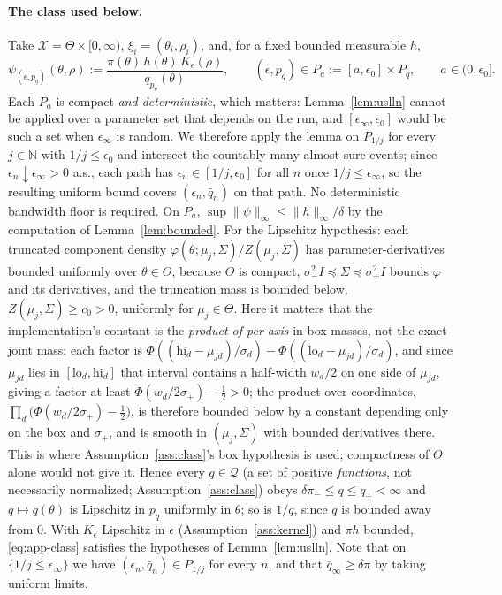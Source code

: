 \documentclass[10pt]{article}
\theoremstyle{plain}
\theoremstyle{definition}
\begin{document}
\paragraph{The class used below.} Take $\mathcal{X}=\Theta\times[0,\infty)$, $\xi_i=(\theta_i,\rho_i)$, and, for a fixed bounded measurable $h$,
\begin{equation}
\psi_{(\epsilon,p_q)}(\theta,\rho):=\frac{\pi(\theta)\,h(\theta)\,K_\epsilon(\rho)}{q_{p_q}(\theta)},
\qquad
(\epsilon,p_q)\in P_a:=[a,\epsilon_0]\times P_q,\qquad a\in(0,\epsilon_0] .
\label{eq:app-class}
\end{equation}
Each $P_a$ is compact \emph{and deterministic}, which matters: Lemma~\ref{lem:uslln} cannot be applied over a parameter set that depends on the run, and $[\epsilon_\infty,\epsilon_0]$ would be such a set when $\epsilon_\infty$ is random. We therefore apply the lemma on $P_{1/j}$ for every $j\in\mathbb{N}$ with $1/j\le\epsilon_0$ and intersect the countably many almost-sure events; since $\epsilon_n\downarrow\epsilon_\infty>0$ a.s., each path has $\epsilon_n\in[1/j,\epsilon_0]$ for all $n$ once $1/j\le\epsilon_\infty$, so the resulting uniform bound covers $(\epsilon_n,\bar q_n)$ on that path. No deterministic bandwidth floor is required. On $P_a$, $\sup\|\psi\|_\infty\le\|h\|_\infty/\delta$ by the computation of Lemma~\ref{lem:bounded}. For the Lipschitz hypothesis: each truncated component density $\varphi(\theta;\mu_j,\Sigma)/Z(\mu_j,\Sigma)$ has parameter-derivatives bounded uniformly over $\theta\in\Theta$, because $\Theta$ is compact, $\sigma_-^2I\preceq\Sigma\preceq\sigma_+^2I$ bounds $\varphi$ and its derivatives, and the truncation mass is bounded below, $Z(\mu_j,\Sigma)\ge c_0>0$, uniformly for $\mu_j\in\Theta$. Here it matters that the implementation's constant is the \emph{product of per-axis} in-box masses, not the exact joint mass: each factor is $\Phi((\mathrm{hi}_d-\mu_{jd})/\sigma_d)-\Phi((\mathrm{lo}_d-\mu_{jd})/\sigma_d)$, and since $\mu_{jd}$ lies in $[\mathrm{lo}_d,\mathrm{hi}_d]$ that interval contains a half-width $w_d/2$ on one side of $\mu_{jd}$, giving a factor at least $\Phi(w_d/2\sigma_+)-\tfrac12>0$; the product over coordinates, $\prod_{d}\bigl(\Phi(w_d/2\sigma_+)-\tfrac12\bigr)$, is therefore bounded below by a constant depending only on the box and $\sigma_+$, and is smooth in $(\mu_j,\Sigma)$ with bounded derivatives there. This is where Assumption~\ref{ass:class}'s box hypothesis is used; compactness of $\Theta$ alone would not give it. Hence every $q\in\mathcal{Q}$ (a set of positive \emph{functions}, not necessarily normalized; Assumption~\ref{ass:class}) obeys $\delta\pi_-\le q\le q_+<\infty$ and $q\mapsto q(\theta)$ is Lipschitz in $p_q$ uniformly in $\theta$; so is $1/q$, since $q$ is bounded away from $0$. With $K_\epsilon$ Lipschitz in $\epsilon$ (Assumption~\ref{ass:kernel}) and $\pi h$ bounded, \eqref{eq:app-class} satisfies the hypotheses of Lemma~\ref{lem:uslln}. Note that on $\{1/j\le\epsilon_\infty\}$ we have $(\epsilon_n,\bar q_n)\in P_{1/j}$ for every $n$, and that $\bar q_\infty\ge\delta\pi$ by taking uniform limits.
\end{document}
